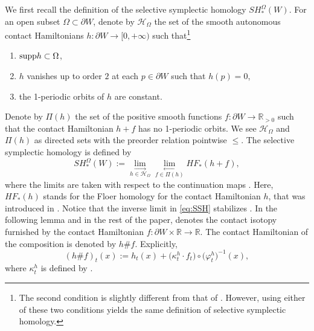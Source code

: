 \documentclass[pdftex]{sigma}
\numberwithin{equation}{section}
\theoremstyle{definition}
\begin{document}
 We first recall the definition of the selective symplectic homology $SH_\ast^\Omega(W)$. For an open subset $\Omega\subset \partial W$, denote by $\mathcal{H}_\Omega$ the set of the smooth autonomous contact Hamiltonians $h\colon \partial W\to[0,+\infty)$ such that\footnote{The second condition is slightly different from that of \cite[Definition~3.1]{uljarevic2023selective}. However, using either of these two conditions yields the same definition of selective symplectic homology.}
 \begin{enumerate}\itemsep=0pt
 \item[(1)] ${\rm supp} h \subset \Omega$,
 \item[(2)] $h$ vanishes up to order $2$ at each $p\in\partial W$ such that $h(p)=0$,
 \item[(3)] the 1-periodic orbits of $h$ are constant.
 \end{enumerate}

 Denote by $\Pi(h)$ the set of the positive smooth functions $f\colon \partial W\to\mathbb{R}_{{>}0}$ such that the contact Hamiltonian $h+f$ has no 1-periodic orbits. {We see $\mathcal{H}_\Omega$ and $\Pi(h)$ as directed sets with the preorder relation pointwise $\leqslant$.} The selective symplectic homology is defined by
 \begin{equation}\label{eq:SSH} SH_\ast^\Omega(W):= \underset{h\in\mathcal{H}_\Omega}{\lim_{\longrightarrow}} \underset{f\in\Pi(h)}{\lim_{\longleftarrow}} HF_\ast(h+f),\end{equation}
 where the limits are taken with respect to the continuation maps {\cite[Section~4]{merry2019maximum}}. Here, $HF_\ast(h)$ stands for the Floer homology for the contact Hamiltonian $h$, that was introduced in \cite{merry2019maximum}. Notice that the inverse limit in \eqref{eq:SSH} stabilizes \cite[Lemma~3.5]{uljarevic2023selective}. In the following lemma and in the rest of the paper,  denotes the contact isotopy furnished by the contact Hamiltonian $f\colon\partial W\times\mathbb{R}\to\mathbb{R}$. {The contact Hamiltonian of the composition  is denoted by $h\# f$. Explicitly,
 \[ (h\# f)_t(x):= h_t(x) + \bigl(\kappa_t^h\cdot f_t\bigr)\circ\bigl(\varphi^h_t\bigr)^{-1}(x), \]
 where $\kappa^h_t$ is defined by .}
\end{document}
